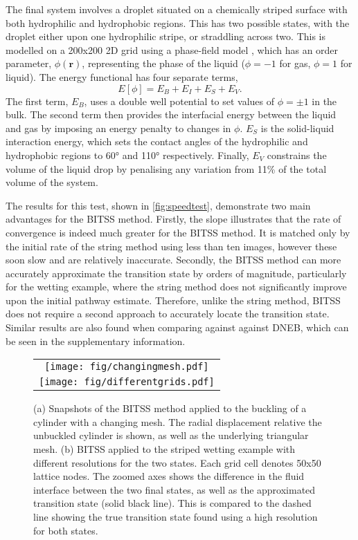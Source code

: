 \documentclass[aps,twocolumn]{revtex4-1}
\begin{document}
\topic The final system involves a droplet situated on a chemically striped surface with both hydrophilic and hydrophobic regions.
This has two possible states, with the droplet either upon one hydrophilic stripe, or straddling across two.
This is modelled on a 200x200 2D grid using a phase-field model \cite{Panter2019b}, which has an order parameter, $\phi(\bm{r})$, representing the phase of the liquid ($\phi=-1$ for gas, $\phi=1$ for liquid).
The energy functional has four separate terms,
\begin{equation}
  E[\phi] = E_B + E_I + E_S + E_V.
\end{equation}
The first term, $E_B$, uses a double well potential to set values of $\phi=\pm1$ in the bulk.
The second term then provides the interfacial energy between the liquid and gas by imposing an energy penalty to changes in $\phi$.
$E_S$ is the solid-liquid interaction energy, which sets the contact angles of the hydrophilic and hydrophobic regions to 60\si{\degree} and 110\si{\degree} respectively.
Finally, $E_V$ constrains the volume of the liquid drop by penalising any variation from 11\% of the total volume of the system.

\topic The results for this test, shown in \cref{fig:speedtest}, demonstrate two main advantages for the BITSS method.
Firstly, the slope illustrates that the rate of convergence is indeed much greater for the BITSS method.
It is matched only by the initial rate of the string method using less than ten images, however these soon slow and are relatively inaccurate.
Secondly, the BITSS method can more accurately approximate the transition state by orders of magnitude, particularly for the wetting example, where the string method does not significantly improve upon the initial pathway estimate.
Therefore, unlike the string method, BITSS does not require a second approach to accurately locate the transition state.
Similar results are also found when comparing against against DNEB, which can be seen in the supplementary information.


\begin{figure}[htb]
  \centering
  \begin{tabular}[b]{c}
    \texttt{[image: fig/changingmesh.pdf]}\\
    \texttt{[image: fig/differentgrids.pdf]}%
  \end{tabular}
  \caption{
    (a) Snapshots of the BITSS method applied to the buckling of a cylinder with a changing mesh.
        The radial displacement relative the unbuckled cylinder is shown, as well as the underlying triangular mesh.
    (b) BITSS applied to the striped wetting example with different resolutions for the two states.
        Each grid cell denotes 50x50 lattice nodes.
        The zoomed axes shows the difference in the fluid interface between the two final states, as well as the approximated transition state (solid black line).
        This is compared to the dashed line showing the true transition state found using a high resolution for both states.
  }
  \label{fig:adaptivemesh}
\end{figure}
\end{document}
